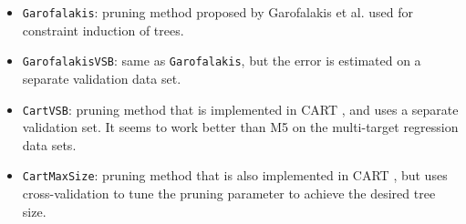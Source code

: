 \begin{itemize}
\begin{itemize}
		\item \texttt{Garofalakis}: pruning method proposed by Garofalakis et al. \cite{Garofalakis03:jrnl} used for constraint induction of trees.
		\item \texttt{GarofalakisVSB}: same as \texttt{Garofalakis}, but the error is estimated on a separate validation data set.
		\item \texttt{CartVSB}: pruning method that is implemented in CART \cite{Breiman1984}, and uses a separate validation set. It seems to work better than M5 on the multi-target regression data sets.
		\item \texttt{CartMaxSize}: pruning method that is also implemented in CART \cite{Breiman1984}, but uses cross-validation to tune the pruning parameter to achieve the desired tree size.
	\end{itemize}
\end{itemize}
